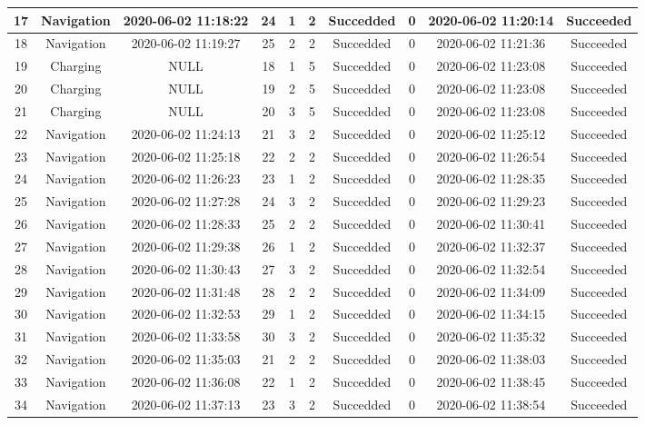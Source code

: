 \begin{table}[]
{\begin{tabular}{|c|c|c|c|c|c|c|c|c|c|}
17 & Navigation & 2020-06-02 11:18:22 & 24 & 1 & 2 & Succedded & 0 & 2020-06-02 11:20:14 & Succeeded \\ \hline
18 & Navigation & 2020-06-02 11:19:27 & 25 & 2 & 2 & Succedded & 0 & 2020-06-02 11:21:36 & Succeeded \\ \hline
19 & Charging & NULL & 18 & 1 & 5 & Succedded & 0 & 2020-06-02 11:23:08 & Succeeded \\ \hline
20 & Charging & NULL & 19 & 2 & 5 & Succedded & 0 & 2020-06-02 11:23:08 & Succeeded \\ \hline
21 & Charging & NULL & 20 & 3 & 5 & Succedded & 0 & 2020-06-02 11:23:08 & Succeeded \\ \hline
22 & Navigation & 2020-06-02 11:24:13 & 21 & 3 & 2 & Succedded & 0 & 2020-06-02 11:25:12 & Succeeded \\ \hline
23 & Navigation & 2020-06-02 11:25:18 & 22 & 2 & 2 & Succedded & 0 & 2020-06-02 11:26:54 & Succeeded \\ \hline
24 & Navigation & 2020-06-02 11:26:23 & 23 & 1 & 2 & Succedded & 0 & 2020-06-02 11:28:35 & Succeeded \\ \hline
25 & Navigation & 2020-06-02 11:27:28 & 24 & 3 & 2 & Succedded & 0 & 2020-06-02 11:29:23 & Succeeded \\ \hline
26 & Navigation & 2020-06-02 11:28:33 & 25 & 2 & 2 & Succedded & 0 & 2020-06-02 11:30:41 & Succeeded \\ \hline
27 & Navigation & 2020-06-02 11:29:38 & 26 & 1 & 2 & Succedded & 0 & 2020-06-02 11:32:37 & Succeeded \\ \hline
28 & Navigation & 2020-06-02 11:30:43 & 27 & 3 & 2 & Succedded & 0 & 2020-06-02 11:32:54 & Succeeded \\ \hline
29 & Navigation & 2020-06-02 11:31:48 & 28 & 2 & 2 & Succedded & 0 & 2020-06-02 11:34:09 & Succeeded \\ \hline
30 & Navigation & 2020-06-02 11:32:53 & 29 & 1 & 2 & Succedded & 0 & 2020-06-02 11:34:15 & Succeeded \\ \hline
31 & Navigation & 2020-06-02 11:33:58 & 30 & 3 & 2 & Succedded & 0 & 2020-06-02 11:35:32 & Succeeded \\ \hline
32 & Navigation & 2020-06-02 11:35:03 & 21 & 2 & 2 & Succedded & 0 & 2020-06-02 11:38:03 & Succeeded \\ \hline
33 & Navigation & 2020-06-02 11:36:08 & 22 & 1 & 2 & Succedded & 0 & 2020-06-02 11:38:45 & Succeeded \\ \hline
34 & Navigation & 2020-06-02 11:37:13 & 23 & 3 & 2 & Succedded & 0 & 2020-06-02 11:38:54 & Succeeded \\ \hline

\end{tabular}}
\end{table}
